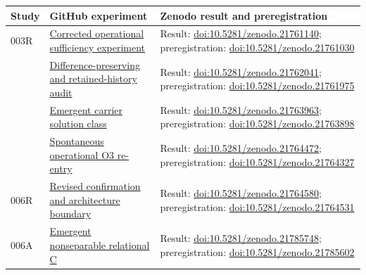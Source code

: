 \documentclass[11pt,a4paper]{article}
\begin{document}
\begin{longtable}{@{}>{\raggedright\arraybackslash}p{1.4cm}>{\raggedright\arraybackslash}p{4.4cm}>{\raggedright\arraybackslash}p{8.2cm}@{}}
\toprule
Study & GitHub experiment & Zenodo result and preregistration \\
\midrule
\endhead
003R & \href{https://github.com/SIEL-Research/Subjectivity-Intersection-Mathematics/tree/main/experiments/003r_subjectivity_agent_class2_o3_corrected}{Corrected operational sufficiency experiment} & Result: \href{https://doi.org/10.5281/zenodo.21761140}{doi:10.5281/zenodo.21761140}; preregistration: \href{https://doi.org/10.5281/zenodo.21761030}{doi:10.5281/zenodo.21761030} \\
004 & \href{https://github.com/SIEL-Research/Subjectivity-Intersection-Mathematics/tree/main/experiments/004_difference_preserving_o3_discrimination}{Difference-preserving and retained-history audit} & Result: \href{https://doi.org/10.5281/zenodo.21762041}{doi:10.5281/zenodo.21762041}; preregistration: \href{https://doi.org/10.5281/zenodo.21761975}{doi:10.5281/zenodo.21761975} \\
005 & \href{https://github.com/SIEL-Research/Subjectivity-Intersection-Mathematics/tree/main/experiments/005_emergent_relational_carrier_solution_class}{Emergent carrier solution class} & Result: \href{https://doi.org/10.5281/zenodo.21763963}{doi:10.5281/zenodo.21763963}; preregistration: \href{https://doi.org/10.5281/zenodo.21763898}{doi:10.5281/zenodo.21763898} \\
006 & \href{https://github.com/SIEL-Research/Subjectivity-Intersection-Mathematics/tree/main/experiments/006_spontaneous_o3_reentry}{Spontaneous operational O3 re-entry} & Result: \href{https://doi.org/10.5281/zenodo.21764472}{doi:10.5281/zenodo.21764472}; preregistration: \href{https://doi.org/10.5281/zenodo.21764327}{doi:10.5281/zenodo.21764327} \\
006R & \href{https://github.com/SIEL-Research/Subjectivity-Intersection-Mathematics/tree/main/experiments/006r_spontaneous_o3_reentry_revised}{Revised confirmation and architecture boundary} & Result: \href{https://doi.org/10.5281/zenodo.21764580}{doi:10.5281/zenodo.21764580}; preregistration: \href{https://doi.org/10.5281/zenodo.21764531}{doi:10.5281/zenodo.21764531} \\
006A & \href{https://github.com/SIEL-Research/Subjectivity-Intersection-Mathematics/tree/main/experiments/006a_emergent_nonseparable_relational_c}{Emergent nonseparable relational C} & Result: \href{https://doi.org/10.5281/zenodo.21785748}{doi:10.5281/zenodo.21785748}; preregistration: \href{https://doi.org/10.5281/zenodo.21785602}{doi:10.5281/zenodo.21785602} \\
\bottomrule
\end{longtable}
\end{document}

